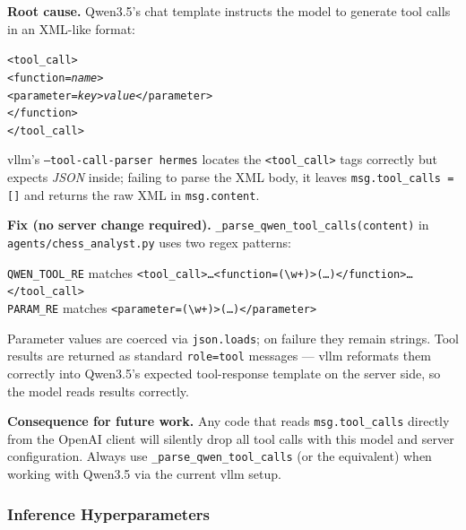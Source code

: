 \begin{tcolorbox}[warnbox,
  title={$\mathbf{!}$\; Tool-Call Format — Qwen3.5 XML (not Hermes JSON)},
  label={box:toolformat}]

\textbf{Root cause.}
Qwen3.5's chat template instructs the model to generate tool calls in an
XML-like format:

\smallskip
\texttt{\phantom{xx}<tool\_call>}\\
\texttt{\phantom{xxxx}<function=\textit{name}>}\\
\texttt{\phantom{xxxxxx}<parameter=\textit{key}>\textit{value}</parameter>}\\
\texttt{\phantom{xxxx}</function>}\\
\texttt{\phantom{xx}</tool\_call>}

\medskip
\noindent vllm's \texttt{--tool-call-parser hermes} locates the
\texttt{<tool\_call>} tags correctly but expects \emph{JSON} inside; failing
to parse the XML body, it leaves \texttt{msg.tool\_calls = []} and returns the
raw XML in \texttt{msg.content}.

\medskip
\textbf{Fix (no server change required).}
\texttt{\_parse\_qwen\_tool\_calls(content)} in \texttt{agents/chess\_analyst.py}
uses two regex patterns:

\smallskip
\texttt{QWEN\_TOOL\_RE} matches \texttt{<tool\_call>{\ldots}<function=(\textbackslash w+)>({\ldots})</function>{\ldots}</tool\_call>}\\
\texttt{PARAM\_RE} matches \texttt{<parameter=(\textbackslash w+)>({\ldots})</parameter>}

\smallskip
\noindent Parameter values are coerced via \texttt{json.loads}; on failure they remain
strings.  Tool results are returned as standard \texttt{role=tool} messages —
vllm reformats them correctly into Qwen3.5's expected tool-response template
on the server side, so the model reads results correctly.

\medskip
\textbf{Consequence for future work.}  Any code that reads \texttt{msg.tool\_calls}
directly from the OpenAI client will silently drop all tool calls with this
model and server configuration.  Always use \texttt{\_parse\_qwen\_tool\_calls}
(or the equivalent) when working with Qwen3.5 via the current vllm setup.
\end{tcolorbox}

\subsubsection{Inference Hyperparameters}
\label{app:details:agent:hparams}

